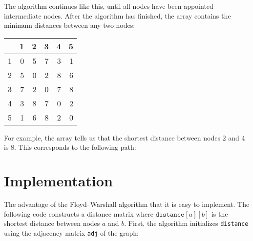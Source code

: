 \documentclass[twoside,12pt,a4paper,english]{book}
\theoremstyle{definition}
\theoremstyle{problemstyle}
\theoremstyle{problemstyle}
\theoremstyle{problemstyle}
\begin{document}
The algorithm continues like this,
until all nodes have been appointed intermediate nodes.
After the algorithm has finished, the array contains
the minimum distances between any two nodes:

\begin{center}
\begin{tabular}{r|rrrrr}
 & 1 & 2 & 3 & 4 & 5 \\
\hline
1 & 0 & 5 & 7 & 3 & 1 \\
2 & 5 & 0 & 2 & 8 & 6 \\
3 & 7 & 2 & 0 & 7 & 8 \\
4 & 3 & 8 & 7 & 0 & 2 \\
5 & 1 & 6 & 8 & 2 & 0 \\
\end{tabular}
\end{center}

For example, the array tells us that the
shortest distance between nodes 2 and 4 is 8.
This corresponds to the following path:

\begin{center}
\end{center}

\section{Implementation}

The advantage of the
Floyd–Warshall algorithm that it is
easy to implement.
The following code constructs a
distance matrix where $\texttt{distance}[a][b]$
is the shortest distance between nodes $a$ and $b$.
First, the algorithm initializes \texttt{distance}
using the adjacency matrix \texttt{adj} of the graph:
\end{document}
